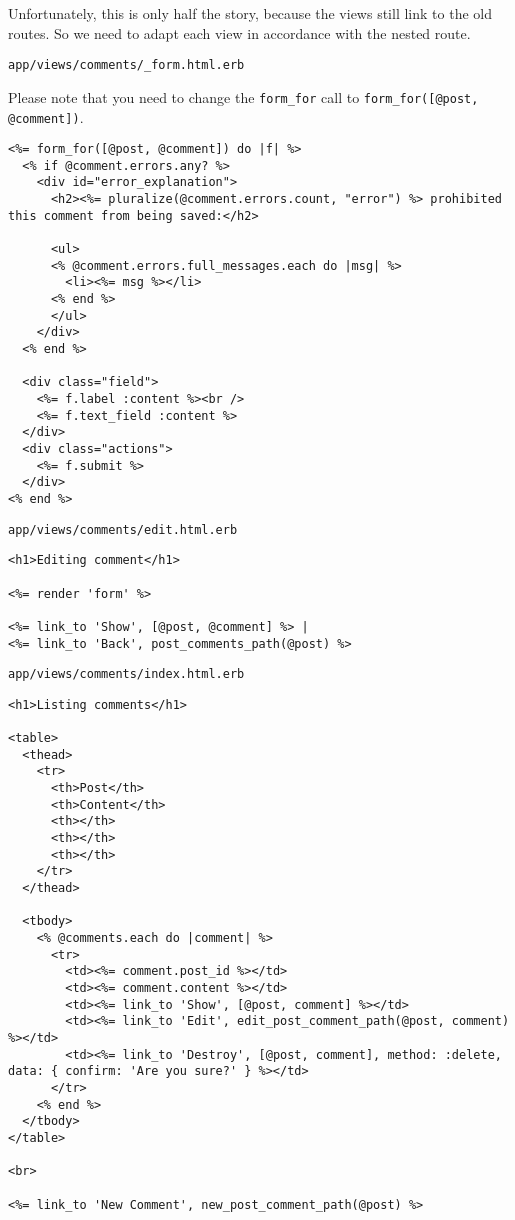 \documentclass[a4paper]{book}
\newcounter{tab}[chapter]
\begin{document}
Unfortunately, this is only half the story, because the views still link to the old routes. So we need to adapt each view in accordance with the nested route.

\texttt{app/views/comments/\_form.html.erb}

Please note that you need to change the \texttt{form\_for} call to \texttt{form\_for({[}@post, @comment{]})}.

\begin{shaded}\begin{verbatim}
<%= form_for([@post, @comment]) do |f| %>
  <% if @comment.errors.any? %>
    <div id="error_explanation">
      <h2><%= pluralize(@comment.errors.count, "error") %> prohibited this comment from being saved:</h2>

      <ul>
      <% @comment.errors.full_messages.each do |msg| %>
        <li><%= msg %></li>
      <% end %>
      </ul>
    </div>
  <% end %>

  <div class="field">
    <%= f.label :content %><br />
    <%= f.text_field :content %>
  </div>
  <div class="actions">
    <%= f.submit %>
  </div>
<% end %>
\end{verbatim}\end{shaded}

\texttt{app/views/comments/edit.html.erb}

\begin{shaded}\begin{verbatim}
<h1>Editing comment</h1>

<%= render 'form' %>

<%= link_to 'Show', [@post, @comment] %> |
<%= link_to 'Back', post_comments_path(@post) %>
\end{verbatim}\end{shaded}

\texttt{app/views/comments/index.html.erb}

\begin{shaded}\begin{verbatim}
<h1>Listing comments</h1>

<table>
  <thead>
    <tr>
      <th>Post</th>
      <th>Content</th>
      <th></th>
      <th></th>
      <th></th>
    </tr>
  </thead>

  <tbody>
    <% @comments.each do |comment| %>
      <tr>
        <td><%= comment.post_id %></td>
        <td><%= comment.content %></td>
        <td><%= link_to 'Show', [@post, comment] %></td>
        <td><%= link_to 'Edit', edit_post_comment_path(@post, comment) %></td>
        <td><%= link_to 'Destroy', [@post, comment], method: :delete, data: { confirm: 'Are you sure?' } %></td>
      </tr>
    <% end %>
  </tbody>
</table>

<br>

<%= link_to 'New Comment', new_post_comment_path(@post) %>
\end{verbatim}\end{shaded}
\end{document}
